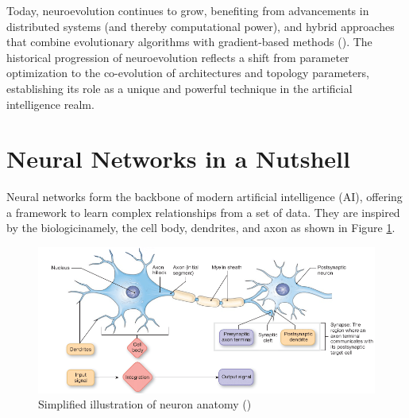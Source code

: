 \parbreak\noindent Today, neuroevolution continues to grow, benefiting from advancements in distributed systems (and thereby computational power), and hybrid approaches that combine evolutionary algorithms with gradient-based methods (\cite{asseman2021accelerating}). The historical progression of neuroevolution reflects a shift from parameter optimization to the co-evolution of architectures and topology parameters, establishing its role as a unique and powerful technique in the artificial intelligence realm.

\section{Neural Networks in a Nutshell}\label{sec:nn_nutshell}
Neural networks form the backbone of modern artificial intelligence (AI), offering a framework to learn complex relationships from a set of data. They are inspired by the biologicinamely, the cell body, dendrites, and axon as shown in Figure \ref{fig:ne_biological_neuron}.

\parbreak
\begin{figure}[H] %
	\centering %
	\includegraphics[width=\textwidth]{Figures/chapter_ne/biological_neuron.png} %
	\caption{Simplified illustration of neuron anatomy (\cite{neuron_model})}
	\label{fig:ne_biological_neuron} %
\end{figure}

